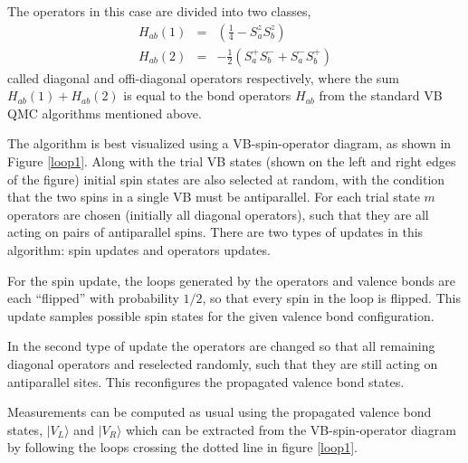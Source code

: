\documentclass[prb,aps,twocolumn,floatfix,amsmath,amssymb,superscriptaddress,tightenlines]{revtex4}
\begin{document}
The operators in this case are divided into two classes,
\begin{eqnarray}
	H_{ab}(1) &=&(\tfrac{1}{4} - S^z_aS^z_b) \\
	H_{ab}(2) &=& %
		         -\tfrac{1}{2}(S_a^+S_b^- + S_a^-S_b^+)
\end{eqnarray}
called diagonal and offi-diagonal operators respectively, where the sum $H_{ab}(1) + H_{ab}(2)$ is equal to the bond operators $H_{ab}$ from the standard VB QMC algorithms mentioned above.

The algorithm is best visualized using a VB-spin-operator diagram, as shown in Figure \ref{loop1}.
Along with the trial VB states (shown on the left and right edges of the figure) initial spin states are also selected at random, with the condition that the two spins in a single VB must be antiparallel.
For each trial state $m$ operators are chosen (initially all diagonal operators), such that they are all acting on pairs of antiparallel spins.
There are two types of updates in this algorithm: spin updates and operators updates.

For the spin update, the loops generated by the operators and valence bonds are each ``flipped'' with probability $1/2$, so that every spin in the loop is flipped.
This update samples possible spin states for the given valence bond configuration.

In the second type of update the operators are changed so that all remaining diagonal operators and reselected randomly, such that they are still acting on antiparallel sites.
This reconfigures the propagated valence bond states.

Measurements can be computed as usual using the propagated valence bond states, $\lvert V_L \rangle$ and $\lvert V_R \rangle$ which can be extracted from the VB-spin-operator diagram by following the loops crossing the dotted line in figure \ref{loop1}.


\end{document}
